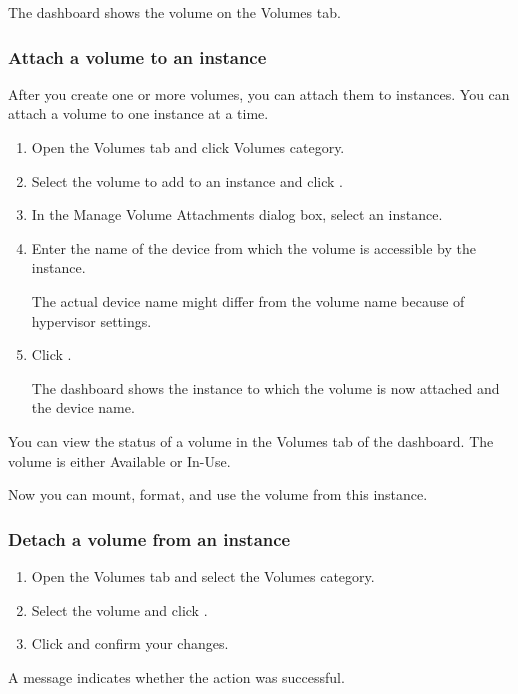 The dashboard shows the volume on the Volumes tab.

\subsubsection{Attach a volume to an
  instance}\label{attach-a-volume-to-an-instance}
After you create one or more volumes, you can attach them to
instances.  You can attach a volume to one instance at a time.

\begin{enumerate}
\item Open the Volumes tab and click Volumes
  category.
\item Select the volume to add to an instance and click .
\item In the Manage Volume Attachments dialog box, select an instance.
\item Enter the name of the device from which the volume is accessible
  by the instance.

   The actual device name might differ from the volume
  name because of hypervisor settings.
\item Click .

  The dashboard shows the instance to which the volume is now attached
  and the device name.
\end{enumerate}
You can view the status of a volume in the Volumes tab of the dashboard.
The volume is either Available or In-Use.

Now you can mount, format, and use the volume from this instance.

\subsubsection{Detach a volume from an instance}\label{detach-a-volume-from-an-instance}
\begin{enumerate}
\item Open the Volumes tab and select the Volumes category.
  \item Select the volume and click .
  \item Click  and confirm your changes.
  \end{enumerate}

A message indicates whether the action was successful.

